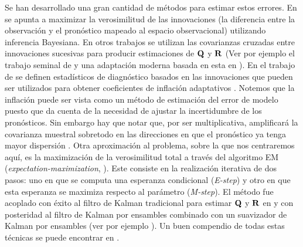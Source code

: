 Se han desarrollado una gran cantidad de métodos para estimar estos errores. En \cite{Stroud2018} se apunta a maximizar la verosimilitud de las innovaciones (la diferencia entre la observación y el pronóstico mapeado al espacio observacional) utilizando inferencia Bayesiana. En otros trabajos se utilizan las covarianzas cruzadas entre innovaciones sucesivas para producir estimaciones de $\mathbf{Q}$ y $\mathbf{R}$ (Ver por ejemplo el trabajo seminal de \cite{Mehra1970} y una adaptación moderna basada en esta en \cite{Berry2013}). En el trabajo de \cite{Desroziers2005} se definen estadísticos de diagnóstico basados en las innovaciones que pueden ser utilizados para obtener coeficientes de inflación adaptativos \citep{Li2009}. Notemos que la inflación puede ser vista como un método de estimación del error de modelo puesto que da cuenta de la necesidad de ajustar la incertidumbre de los pronósticos. Sin embargo hay que notar que, por ser multiplicativa, amplificará la covarianza muestral sobretodo en las direcciones en que el pronóstico ya tenga mayor dispersión \citep{Hamill2005}. Otra aproximación al problema, sobre la que nos centraremos aquí, es la maximización de la verosimilitud total a través del algoritmo EM (\textit{expectation-maximization}, \cite{Dempster1977}). Este consiste en la realización iterativa de dos pasos: uno en que se computa una esperanza condicional (\textit{E-step}) y otro en que esta esperanza se maximiza respecto al parámetro (\textit{M-step}). El método fue acoplado con éxito al filtro de Kalman tradicional para estimar $\mathbf{Q}$ y $\mathbf{R}$ en \cite{Shumway1982} y con posteridad al filtro de Kalman por ensambles combinado con un suavizador de Kalman por ensambles (ver por ejemplo \cite{Dreano2017}). Un buen compendio de todas estas técnicas se puede encontrar en \cite{Tandeo2020}.

